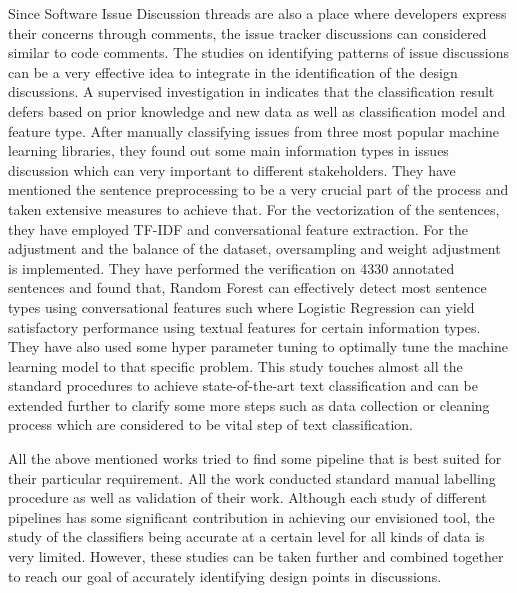Since Software Issue Discussion threads are also a place where developers express their concerns through comments, the issue tracker discussions can considered similar to code comments. The studies on identifying patterns of issue discussions can be a very effective idea to integrate in the identification of the design discussions. A supervised investigation in \cite{Arya2019} indicates that the classification result defers based on prior knowledge and new data as well as classification model and feature type. After manually classifying issues from three most popular machine learning libraries, they found out some main information types in issues discussion which can very important to different stakeholders. They have mentioned the sentence preprocessing to be a very crucial part of the process and taken extensive measures to achieve that. For the vectorization of the sentences, they have employed TF-IDF  and conversational feature extraction. For the adjustment and the balance of the dataset, oversampling and weight adjustment is implemented. They have performed the verification on 4330 annotated sentences and found that, Random Forest can effectively detect most sentence types using conversational features such where Logistic Regression can yield satisfactory performance using textual features for certain information types. They have also used some hyper parameter tuning to optimally tune the machine learning model to that specific problem. This study touches almost all the standard procedures to achieve state-of-the-art text classification and can be extended further to clarify some more steps such as data collection or cleaning process which are considered to be vital step of text classification.

All the above mentioned works tried to find some pipeline that is best suited for their particular requirement. All the work conducted standard manual labelling procedure as well as validation of their work. Although each study of different pipelines has some significant contribution in achieving our envisioned tool, the study of the classifiers being accurate at a certain level for all kinds of data is very limited. However, these studies can be taken further and combined together to reach our goal of accurately identifying design points in discussions.                         